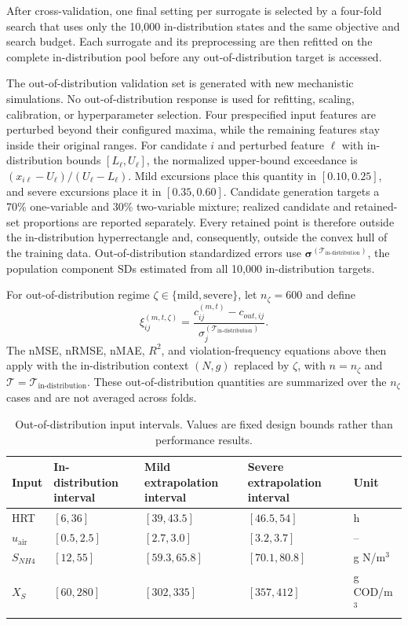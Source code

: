 \documentclass[a4paper,fleqn]{cas-sc}
\newcommand{\csvcomma}{,}
\begin{document}
After cross-validation, one final setting per surrogate is selected by a four-fold search that uses only the 10,000 in-distribution states and the same objective and search budget. Each surrogate and its preprocessing are then refitted on the complete in-distribution pool before any out-of-distribution target is accessed.

The out-of-distribution validation set is generated with new mechanistic simulations. No out-of-distribution response is used for refitting, scaling, calibration, or hyperparameter selection. Four prespecified input features are perturbed beyond their configured maxima, while the remaining features stay inside their original ranges. For candidate $i$ and perturbed feature $\ell$ with in-distribution bounds $[L_\ell,U_\ell]$, the normalized upper-bound exceedance is $(x_{i\ell}-U_\ell)/(U_\ell-L_\ell)$. Mild excursions place this quantity in $[0.10,0.25]$, and severe excursions place it in $[0.35,0.60]$. Candidate generation targets a 70\% one-variable and 30\% two-variable mixture; realized candidate and retained-set proportions are reported separately. Every retained point is therefore outside the in-distribution hyperrectangle and, consequently, outside the convex hull of the training data. Out-of-distribution standardized errors use $\boldsymbol{\sigma}^{(\mathcal{T}_{\mathrm{in\text{-}distribution}})}$, the population component SDs estimated from all 10,000 in-distribution targets.

For out-of-distribution regime $\zeta\in\{\mathrm{mild},\mathrm{severe}\}$, let $n_\zeta=600$ and define
\begin{equation}
\xi_{ij}^{(m,t,\zeta)}
=\frac{c_{ij}^{(m,t)}-c_{out,ij}}
{\sigma_j^{(\mathcal{T}_{\mathrm{in\text{-}distribution}})}}.
\end{equation}
The nMSE, nRMSE, nMAE, $R^2$, and violation-frequency equations above then apply with the in-distribution context $(N,g)$ replaced by $\zeta$, with $n=n_\zeta$ and $\mathcal{T}=\mathcal{T}_{\mathrm{in\text{-}distribution}}$. These out-of-distribution quantities are summarized over the $n_\zeta$ cases and are not averaged across folds.

\begin{table}[htbp]
\centering
\caption{Out-of-distribution input intervals. Values are fixed design bounds rather than performance results.}
\label{tab:ood_domain}
\scriptsize
\begin{tabular}{lllll}
\toprule
Input & In-distribution interval & Mild extrapolation interval & Severe extrapolation interval & Unit \\
\midrule
HRT & $[6\csvcomma{}36]$ & $[39\csvcomma{}43.5]$ & $[46.5\csvcomma{}54]$ & h \\
$u_{\mathrm{air}}$ & $[0.5\csvcomma{}2.5]$ & $[2.7\csvcomma{}3.0]$ & $[3.2\csvcomma{}3.7]$ & -- \\
$S_{NH4}$ & $[12\csvcomma{}55]$ & $[59.3\csvcomma{}65.8]$ & $[70.1\csvcomma{}80.8]$ & g N/m$^3$ \\
$X_S$ & $[60\csvcomma{}280]$ & $[302\csvcomma{}335]$ & $[357\csvcomma{}412]$ & g COD/m$^3$ \\
\bottomrule
\end{tabular}
\end{table}
\end{document}
